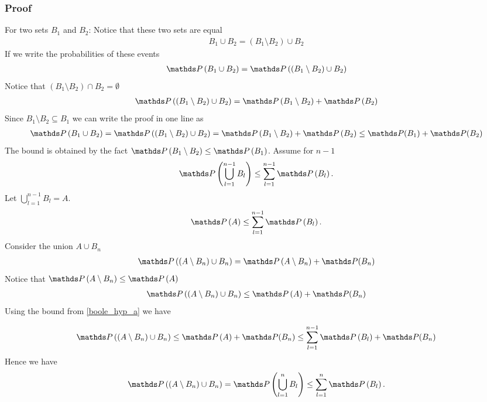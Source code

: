 \documentclass[a4paper, english, headtopline=0.08em, headsepline=0.04em, left = 1cm, right = 1cm, DIV=15]{article}
\begin{document}
\subsubsection*{Proof}
For two sets $B_1$ and $B_2$: Notice that these two sets are equal
\begin{align*}
	B_1 \cup B_2 = \left(B_1 \setminus B_2\right) \cup B_2
\end{align*}
If we write the probabilities of these events 
\begin{align*}
	\PP \left(B_1 \cup B_2 \right) = \PP\left(\left(B_1 \setminus B_2\right) \cup B_2\right)
\end{align*} 
Notice that $\left(B_1 \setminus B_2\right) \cap B_2 = \emptyset$
\begin{align*}
	\PP\left(\left( B_1 \setminus B_2 \right) \cup B_2\right) = \PP \left(B_1 \setminus B_2 \right) + \PP \left( B_2 \right)
\end{align*}
Since $ B_1 \setminus B_2  \subseteq B_1$ we can write the proof in one line as
\begin{align*}
	\PP \left(B_1 \cup B_2 \right)=\PP \left(\left(B_1 \setminus B_2\right) \cup B_2 \right) = \PP \left(B_1 \setminus B_2 \right) + \PP \left( B_2 \right)  \leq \PP(B_1) + \PP(B_2)
\end{align*}
The bound is obtained by the fact $\PP \left(B_1 \setminus B_2 \right) \leq \PP \left(B_1\right)$.
Assume for $n-1$
\begin{align}\label{boole_hyp}
	\PP\left(\bigcup_{l=1}^{n-1}B_{l}\right)\leq\sum_{l=1}^{n-1}\PP \left(B_{l}\right).
\end{align}
Let $\bigcup_{l=1}^{n-1}B_{l} = A$. 
\begin{align}\label{boole_hyp_a}
	\PP\left(A\right)\leq\sum_{l=1}^{n-1}\PP \left(B_{l}\right).
\end{align}
Consider the union $A \cup B_n$
\begin{align*}
	\PP\left(\left(A\setminus B_n\right) \cup B_n \right) = \PP\left(A\setminus B_n\right) + \PP(B_n) 
\end{align*}
Notice that $ \PP \left(A \setminus B_n \right) \leq \PP \left(A\right)$
\begin{align*}
	\PP\left(\left(A\setminus B_n\right) \cup B_n \right) \leq \PP\left(A\right) + \PP(B_n) 
\end{align*}
Using the bound from \cref{boole_hyp_a} we have

\begin{align*}
	\PP\left(\left(A\setminus B_n\right) \cup B_n \right) \leq \PP\left(A\right) + \PP(B_n) \leq \sum_{l=1}^{n-1}\PP \left(B_{l}\right) + \PP(B_n)
\end{align*}
Hence we have
\begin{align*}
	\PP\left(\left(A\setminus B_n\right) \cup B_n \right) = \PP\left(\bigcup_{l=1}^{n}B_{l}\right) \leq \sum_{l=1}^{n}\PP \left(B_{l}\right).
\end{align*}
\end{document}
